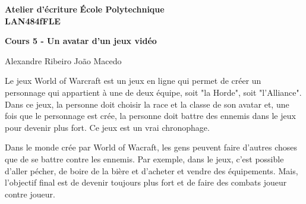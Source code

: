 \documentclass[10pt]{article} %
\newcommand{\createHeader}[6]{
	\noindent
	\normalsize\textbf{#2} \hfill \textbf{#1}\\
	\normalsize\textbf{#3} \hfill \textbf{\displaydate{#6}}\vspace{20pt}
	\centerline{\Large \textbf{#5}}\vspace{3pt}
	\centerline{\normalsize #4}\vspace{20pt}}
\begin{document}
	\createHeader{École Polytechnique}{Atelier d'écriture}{LAN484fFLE}{Alexandre Ribeiro João Macedo}{Cours 5 - Un avatar d'un jeux vidéo}{date}

Le jeux World of Warcraft est un jeux en ligne qui permet de créer un personnage qui appartient à une de deux équipe, soit "la Horde", soit "l'Alliance". Dans ce jeux, la personne doit choisir la race et la classe de son avatar et, une fois que le personnage est crée, la personne doit battre des ennemis dans le jeux pour devenir plus fort. Ce jeux est un vrai chronophage.

Dans le monde crée par World of Wacraft, les gens peuvent faire d’autres choses que de se battre contre les ennemis. Par exemple, dans le jeux, c'est possible d'aller pécher, de boire de la bière et d'acheter et vendre des équipements. Mais, l'objectif final est de devenir toujours plus fort et de faire des combats joueur contre joueur.   
\end{document}
